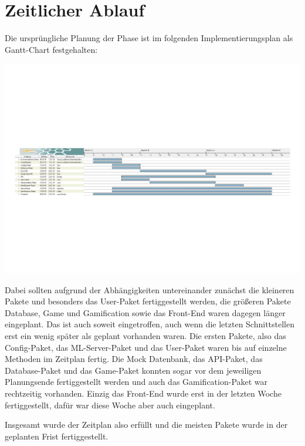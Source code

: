 \documentclass[a4paper]{scrreprt}
\begin{document}
\chapter{Zeitlicher Ablauf}
Die ursprüngliche Planung der Phase ist im folgenden Implementierungsplan als Gantt-Chart festgehalten:

\includegraphics[width=\linewidth]{img/gantt.pdf} %

Dabei sollten aufgrund der Abhängigkeiten untereinander zunächst die kleineren Pakete und besonders das User-Paket fertiggestellt werden, die größeren Pakete Database, Game und Gamification sowie das Front-End waren dagegen länger eingeplant. Das ist auch soweit eingetroffen, auch wenn die letzten Schnittstellen erst ein wenig später als geplant vorhanden waren. Die ersten Pakete, also das Config-Paket, das ML-Server-Paket und das User-Paket waren bis auf einzelne Methoden im Zeitplan fertig. Die Mock Datenbank, das API-Paket, das Database-Paket und das Game-Paket konnten sogar vor dem jeweiligen Planungsende fertiggestellt werden und auch das Gamification-Paket war rechtzeitig vorhanden. Einzig das Front-End wurde erst in der letzten Woche fertiggestellt, dafür war diese Woche aber auch eingeplant.

\hspace{1cm}

Insgesamt wurde der Zeitplan also erfüllt und die meisten Pakete wurde in der geplanten Frist fertiggestellt.
\end{document}

